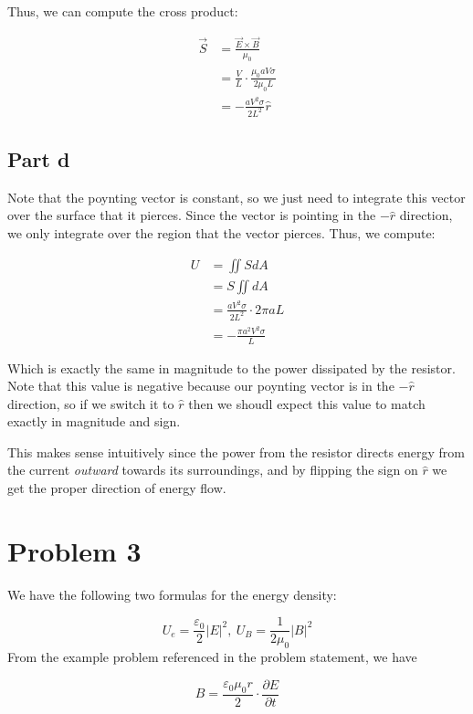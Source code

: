 \documentclass{article}
\theoremstyle{definition}
\numberwithin{equation}{section}
\numberwithin{definition}{section}
\begin{document}
Thus, we can compute the cross product:

\begin{align*}
    \vec S &= \frac{\vec E \times \vec B}{\mu_0}\\
    &= \frac{V}{L} \cdot \frac{\mu_0 a V\sigma}{2\mu_0L}\\
    &= -\frac{a V^2 \sigma}{2L^2} \hat r
\end{align*}


\subsection*{Part d}

Note that the poynting vector is constant, so we just need to integrate this vector over the surface that it pierces. Since the vector is pointing in the $-\hat r$ direction, we only integrate over the region that the vector pierces. Thus, we compute:

\begin{align*}
    U &= \iint S dA \\
    &= S \iint dA\\
    &= \frac{aV^2 \sigma}{2L^2} \cdot 2\pi a L\\
    &= -\frac{\pi a^2 V^2 \sigma}{L}
\end{align*}

Which is exactly the same in magnitude to the power dissipated by the resistor. Note that this value is negative because our poynting vector is in the $-\hat r$ direction, so if we switch it to $\hat r$ then we shoudl expect this value to match exactly in magnitude and sign. 

This makes sense intuitively since the power from the resistor directs energy from the current \textit{outward} towards its surroundings, and by flipping the sign on $\hat r$ we get the proper direction of energy flow.


\section{Problem 3}


We have the following two formulas for the energy density:

\[ U_e = \frac{\varepsilon_0}{2}|E|^2, \ U_B = \frac{1}{2\mu_0} |B|^2 \]
From the example problem referenced in the problem statement, we have 

\[ B = \frac{\varepsilon_0\mu_0 r}{2} \cdot \frac{\partial E}{\partial t}\]
\end{document}
